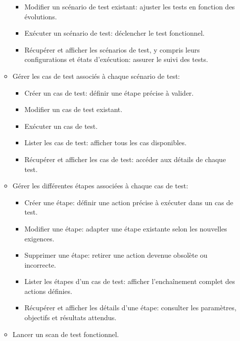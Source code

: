 \begin{justify}
\begin{enumerate}[left=-0.01cm]
\begin{itemize}[label=$\bullet$, left=-0.05cm]
\begin{itemize}[label=$-$, left=-0.08cm]
                        \item Modifier un scénario de test existant: ajuster les tests en fonction des évolutions.
                        \item Exécuter un scénario de test: déclencher le test fonctionnel.
                        \item Récupérer et afficher les scénarios de test, y compris leurs configurations et états d'exécution: assurer le suivi des tests.
                    \end{itemize}
                \item Gérer les cas de test associés à chaque scénario de test:
                    \begin{itemize}[label=$-$, left=-0.08cm]
                        \item Créer un cas de test: définir une étape précise à valider.
                        \item Modifier un cas de test existant.
                        \item Exécuter un cas de test.
                        \item Lister les cas de test: afficher tous les cas disponibles.
                        \item Récupérer et afficher les cas de test: accéder aux détails de chaque test.
                    \end{itemize}
                \item Gérer les différentes étapes associées à chaque cas de test:
                    \begin{itemize}[label=$-$, left=-0.08cm]
                        \item Créer une étape: définir une action précise à exécuter dans un cas de test.
                        \item Modifier une étape: adapter une étape existante selon les nouvelles exigences.
                        \item Supprimer une étape: retirer une action devenue obsolète ou incorrecte.
                        \item Lister les étapes d’un cas de test: afficher l’enchaînement complet des actions définies.
                        \item Récupérer et afficher les détails d’une étape: consulter les paramètres, objectifs et résultats attendus.
                    \end{itemize}
                \item Lancer un scan de test fonctionnel.

\end{itemize}
\end{enumerate}
\end{justify}
